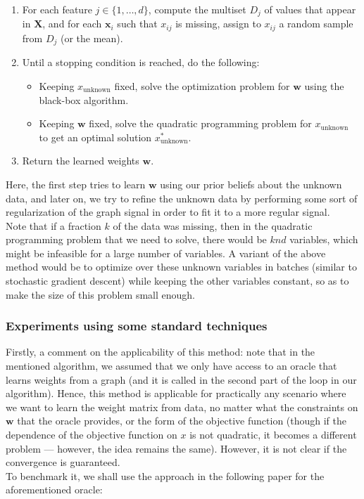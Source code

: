 \documentclass[a4paper]{article}
\newcommand{\nl}{\vspace{0.2cm}\\}
\newcommand{\mf}{\mathbf}
\begin{document}
\begin{enumerate}
    \item For each feature $j \in \{1, \ldots, d\}$, compute the multiset $D_j$ of values that appear in $\mf{X}$, and for each $\mf{x}_i$ such that $x_{ij}$ is missing, assign
        to $x_{ij}$ a random sample from $D_j$ (or the mean).
    \item Until a stopping condition is reached, do the following:
        \begin{itemize}
            \item Keeping $x_{\text{unknown}}$ fixed, solve the optimization problem for $\mf{w}$ using the black-box algorithm.
            \item Keeping $\mf{w}$ fixed, solve the quadratic programming problem for $x_{\text{unknown}}$ to get an optimal solution $x^*_{\text{unknown}}$.
        \end{itemize}
    \item Return the learned weights $\mf{w}$.
\end{enumerate}

Here, the first step tries to learn $\mf{w}$ using our prior beliefs about the unknown data, and later on, we try to refine the unknown data by performing some sort of regularization of the
graph signal in order to fit it to a more regular signal.\nl

Note that if a fraction $k$ of the data was missing, then in the quadratic programming problem that we need to solve, there would be $knd$ variables, which might be infeasible for a
large number of variables. A variant of the above method would be to optimize over these unknown variables in batches (similar to stochastic gradient descent) while keeping the other variables
constant, so as to make the size of this problem small enough.

\subsubsection{Experiments using some standard techniques}
Firstly, a comment on the applicability of this method: note that in the mentioned algorithm, we assumed that we only have access to an oracle that learns weights from a graph (and it is called in
the second part of the loop in our algorithm). Hence, this method is applicable for practically any scenario where we want to learn the weight matrix from data, no matter what the constraints
on $\mf{w}$ that the oracle provides, or the form of the objective function (though if the dependence of the objective function on $x$ is not quadratic, it becomes a different problem ---
however, the idea remains the same). However, it is not clear if the convergence is guaranteed.\nl
To benchmark it, we shall use the approach in the following paper for the aforementioned oracle:
\end{document}

